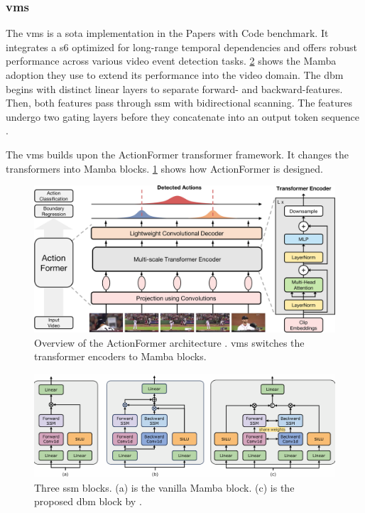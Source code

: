 \subsubsection{\acrfull{vms}}
The \acrfull{vms} is a \acrfull{sota} implementation in the Papers with Code benchmark. It integrates a \acrlong{s6} optimized for long-range temporal dependencies and offers robust performance across various video event detection tasks. \cref{fig:mamba_ssm} shows the Mamba adoption they use to extend its performance into the video domain. The \acrfull{dbm} begins with distinct linear layers to separate forward- and backward-features. Then, both features pass through \acrshort{ssm} with bidirectional scanning. The features undergo two gating layers before they concatenate into an output token sequence \cite{li_videomamba_2024}. 

The \acrlong{vms} builds upon the ActionFormer transformer framework. It changes the transformers into Mamba blocks. \cref{fig:actionformer_architecture} shows how ActionFormer is designed. 

\begin{figure}
    \centering
    \includegraphics[width=1\linewidth]{figures/actionformer_architecture.jpg}
    \caption{Overview of the ActionFormer architecture \cite{zhang_actionformer_2022} . \acrshort{vms} switches the transformer encoders to Mamba blocks. }
    \label{fig:actionformer_architecture}
\end{figure}

\begin{figure}
    \centering
    \includegraphics[width=1\linewidth]{figures/mamba_ssm.png}
    \caption{Three \acrshort{ssm} blocks. (a) is the vanilla Mamba block\cite{gu_mamba_2024}. (c) is the proposed \acrshort{dbm} block by \textcite{li_videomamba_2024}.}
    \label{fig:mamba_ssm}
\end{figure}

